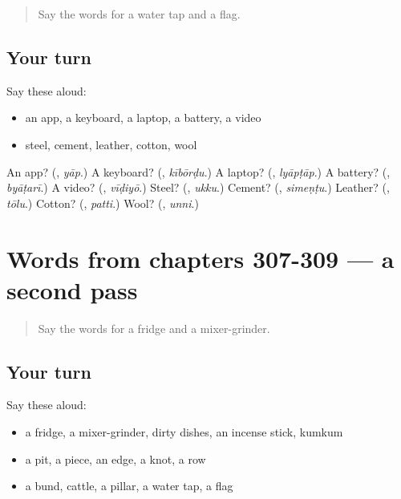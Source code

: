 \label{lesson:TE-R309-first-pass-words-from-chapters-305-306}



\begin{quote}
Say the words for a water tap and a flag.
\end{quote}

\subsection*{Your turn}
Say these aloud:

\begin{itemize}
\raggedright
  \item an app, a keyboard, a laptop, a battery, a video
  \item steel, cement, leather, cotton, wool
\end{itemize}

\begin{tcolorbox}[breakable,colback=teal!4,colframe=teal!35!black,title={Before you move on}]
An app? (\textbf{}, \emph{yāp}.) A keyboard? (\textbf{}, \emph{kībōrḍu}.) A laptop? (\textbf{}, \emph{lyāpṭāp}.) A battery? (\textbf{}, \emph{byāṭarī}.) A video? (\textbf{}, \emph{vīḍiyō}.) Steel? (\textbf{}, \emph{ukku}.) Cement? (\textbf{}, \emph{simeṇṭu}.) Leather? (\textbf{}, \emph{tōlu}.) Cotton? (\textbf{}, \emph{patti}.) Wool? (\textbf{}, \emph{unni}.)
\end{tcolorbox}
\section[(dialogue)]{Words from chapters 307-309 — a second pass}

\label{lesson:TE-R309-second-pass-words-from-chapters-307-309}



\begin{quote}
Say the words for a fridge and a mixer-grinder.
\end{quote}

\subsection*{Your turn}
Say these aloud:

\begin{itemize}
\raggedright
  \item a fridge, a mixer-grinder, dirty dishes, an incense stick, kumkum
  \item a pit, a piece, an edge, a knot, a row
  \item a bund, cattle, a pillar, a water tap, a flag
\end{itemize}


